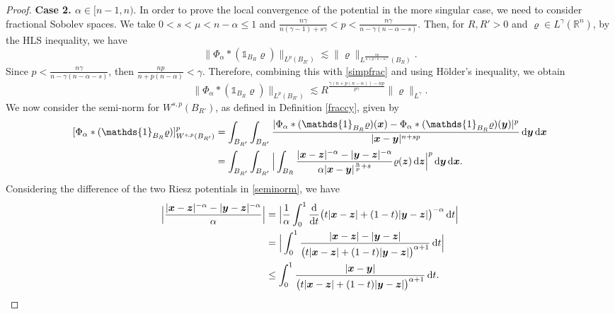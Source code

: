\documentclass[reqno,11pt]{amsart}
\numberwithin{equation}{section}
\theoremstyle{definition}
\def\d{{\rm d}}
\def\dd{{\, \rm d}}
\begin{document}
\begin{proof}
\medskip    
\noindent   
{\bf Case 2. $\alpha \in [n-1,n)$}.
In order to prove the local convergence of the potential in the more singular case, 
we need to consider fractional Sobolev spaces.
We take $0 < s < \mu < n - \alpha \leq 1$ and 
$\frac{n\gamma}{n(\gamma - 1) + s\gamma} < p < \frac{n \gamma}{n - \gamma(n - \alpha - s)}$. 
Then, for $R,R'>0$ and $\varrho \in L^\gamma(\mathbb{R}^n)$, by the HLS inequality, we have
 \begin{equation}\label{simpfrac}
 \|\Phi_\alpha*(\mathds{1}_{B_R}\varrho)\|_{L^p(B_{R'})}
 \lesssim \|\varrho\|_{L^\frac{np}{n + p(n-\alpha)}(B_R)}.
 \end{equation}
 Since $p < \frac{n \gamma}{n - \gamma(n - \alpha - s)}$, 
 then $\frac{np}{n + p(n-\alpha)} < \gamma$. 
 Therefore, combining this with \eqref{simpfrac} and using H\"older's inequality, we obtain
  \[ \|\Phi_\alpha*(\mathds{1}_{B_R}\varrho)\|_{L^p(B_{R'})} \lesssim R^\frac{\gamma(n + p(n-\alpha)) - np}{p\gamma} \|\varrho\|_{L^\gamma}.
 \]
We now consider the semi-norm for $W^{s,p}(B_{R'})$, as defined in Definition \ref{fraccy}, given by
\begin{align}\label{seminorm}
 \begin{split}
 [\Phi_\alpha*(\mathds{1}_{B_R}\varrho)]_{W^{s,p}(B_{R'})}^p & = \int_{B_{R'}} \int_{B_{R'}} \frac{|\Phi_\alpha*(\mathds{1}_{B_R}\varrho)(\boldsymbol{x}) - \Phi_\alpha*(\mathds{1}_{B_R}\varrho)(\boldsymbol{y})|^p}{|\boldsymbol{x} - \boldsymbol{y}|^{n + sp}} \dd \boldsymbol{y} \dd \boldsymbol{x} \\
 & = \int_{B_{R'}} \int_{B_{R'}} \Big | \int_{B_R} \frac{|\boldsymbol{x} - \boldsymbol{z}|^{-\alpha} - |\boldsymbol{y} - \boldsymbol{z}|^{-\alpha}}{\alpha |\boldsymbol{x} - \boldsymbol{y}|^{\frac{n}{p} + s}} \varrho(\boldsymbol{z}) \dd \boldsymbol{z} \Big|^p \dd \boldsymbol{y} \dd \boldsymbol{x}.
\end{split}
\end{align}
Considering the difference of the two Riesz potentials in \eqref{seminorm}, we have
\begin{align}\label{fracfirst}
 \begin{split}
 \Big| \frac{|\boldsymbol{x} - \boldsymbol{z}|^{-\alpha} - |\boldsymbol{y} - \boldsymbol{z}|^{-\alpha}}{\alpha} \Big|
 & = \Big| \frac{1}{\alpha} \int^1_0 \frac{\d}{\d t} \big ( t |\boldsymbol{x} - \boldsymbol{z}| + (1-t) |\boldsymbol{y} - \boldsymbol{z}| \big )^{- \alpha} \dd t \Big| \\
 & = \Big| \int^1_0 \frac{|\boldsymbol{x} - \boldsymbol{z}| - |\boldsymbol{y} - \boldsymbol{z}|}{\big ( t |\boldsymbol{x} - \boldsymbol{z}| + (1-t) |\boldsymbol{y} - \boldsymbol{z}| \big )^{\alpha + 1}} \dd t \Big| \\
& \leq  \int^1_0 \frac{|\boldsymbol{x} - \boldsymbol{y}|}{\big ( t |\boldsymbol{x} - \boldsymbol{z}| + (1-t) |\boldsymbol{y} - \boldsymbol{z}| \big )^{\alpha + 1}} \dd t.
\end{split}
\end{align}
        

\end{proof}
\end{document}
